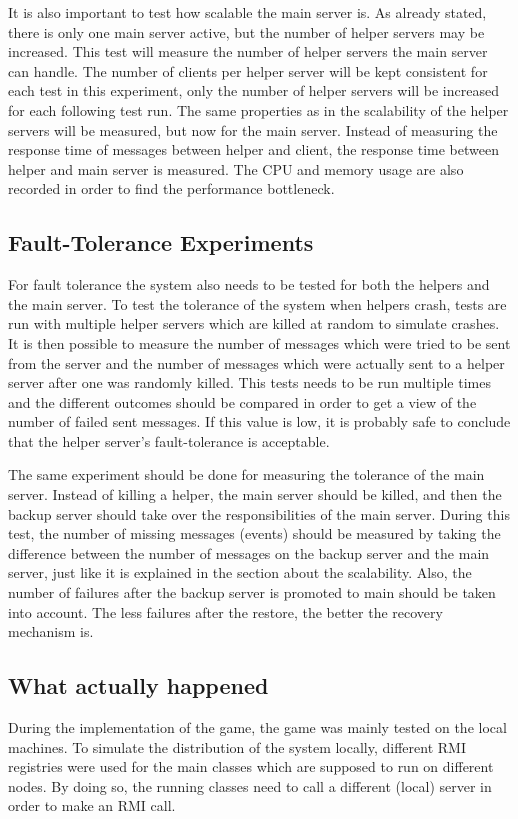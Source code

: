It is also important to test how scalable the main server is. 
As already stated, there is only one main server active, but the number of helper servers may be increased.
This test will measure  the number of helper servers the main server can handle.
The number of clients per helper server will be kept consistent for each test in this experiment, only the number of helper servers will be increased for each following test run.
The same properties as in the scalability of the helper servers will be measured, but now for the main server.
Instead of measuring the response time of messages between helper and client, the response time between helper and main server is measured.
The CPU and memory usage are also recorded in order to find the performance bottleneck.


\subsection{Fault-Tolerance Experiments}
For fault tolerance the system also needs to be tested for both the helpers and the main server.
To test the tolerance of the system when helpers crash, tests are run with multiple helper servers which are killed at random to simulate crashes.
It is then possible to measure the number of messages which were tried to be sent from the server and the number of messages which were actually sent to a helper server after one was randomly killed.
This tests needs to be run multiple times and the different outcomes should be compared in order to get a view of the number of failed sent messages.
If this value is low, it is probably safe to conclude that the helper server's fault-tolerance is acceptable.

The same experiment should be done for measuring the tolerance of the main server.
Instead of killing a helper, the main server should be killed, and then the backup server should take over the responsibilities of the main server.
During this test, the number of missing messages (events) should be measured by taking the difference between the number of messages on the backup server and the main server, just like it is explained in the section about the scalability.
Also, the number of failures after the backup server is promoted to main should be taken into account.
The less failures after the restore, the better the recovery mechanism is.

\subsection{What actually happened}
During the implementation of the game, the game was mainly tested on the local machines.
To simulate the distribution of the system locally, different RMI registries were used for the main classes which are supposed to run on different nodes.
By doing so, the running classes need to call a different (local) server in order to make an RMI call.

